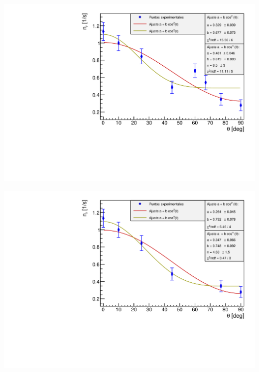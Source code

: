 \documentclass[11pt]{article}
\begin{document}
\begin{minipage}[t]{0.47\linewidth}
	\label{Fig:angulo1}
	\begin{center}
	\includegraphics[width=0.99\linewidth]{../Graficas/Angulos.pdf}
	\end{center}
\end{minipage}
\hfill
\begin{minipage}[t]{0.47\linewidth}
	\label{Fig:angulo2}
	\begin{center}
	\includegraphics[width=0.99\linewidth]{../Graficas/Angulos_2.pdf}
	\end{center}
\end{minipage}
\end{document}
